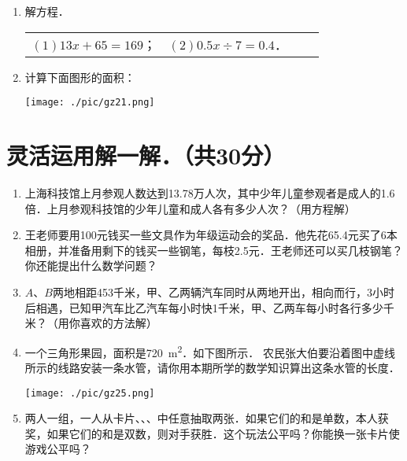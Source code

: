 \documentclass[12pt,twoside,space]{ctexart}
\begin{document}
\begin{enumerate}[itemsep=0.2em,topsep=0pt]
        \item 解方程．\\[0.5em]
          \begin{tabular*}{\textwidth}{@{\extracolsep{\fill}} llll}
            $(1)13x+65=169$； \vspace{6em} & $(2)0.5x\div 7=0.4$．
          \end{tabular*}

        \item 计算下面图形的面积：\\[0.2em]
          \begin{minipage}{\textwidth}
            \texttt{[image: ./pic/gz21.png]}
          \end{minipage}
    \end{enumerate}

    \section{灵活运用解一解．（共30分）}
      \begin{enumerate}[itemsep=4.5em,topsep=0pt]
        \item 上海科技馆上月参观人数达到13.78万人次，其中少年儿童参观者是成人的1.6倍．上月参观科技馆的少年儿童和成人各有多少人次？（用方程解）

        \item 王老师要用100元钱买一些文具作为年级运动会的奖品．他先花65.4元买了6本相册，并准备用剩下的钱买一些钢笔，每枝2.5元．王老师还可以买几枝钢笔？你还能提出什么数学问题？
        \item $A$、$B$两地相距453千米，甲、乙两辆汽车同时从两地开出，相向而行，3小时后相遇，已知甲汽车比乙汽车每小时快1千米，甲、乙两车每小时各行多少千米？（用你喜欢的方法解）
        \item 一个三角形果园，面积是\SI{720}{m^2}．如下图所示． 农民张大伯要沿着图中虚线所示的线路安装一条水管，请你用本期所学的数学知识算出这条水管的长度．\\[0.5em]
          \begin{minipage}{\textwidth}
            \texttt{[image: ./pic/gz25.png]}
          \end{minipage}
        \item 两人一组，一人从卡片、、、中任意抽取两张．如果它们的和是单数，本人获奖，如果它们的和是双数，则对手获胜．这个玩法公平吗？你能换一张卡片使游戏公平吗？
      \end{enumerate}
\end{document}
